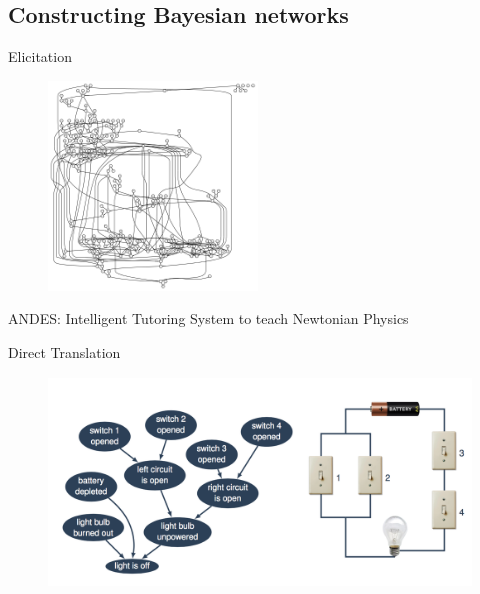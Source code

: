 \subsection{Constructing Bayesian networks}
	\begin{frame}
	\end{frame}
	
	\begin{frame}{Elicitation}
		\begin{figure}
			\centering
			\includegraphics[height=15em]{images/andes}
		\end{figure}
		ANDES: Intelligent Tutoring System to teach Newtonian Physics
	\end{frame}
	
	\begin{frame}{Direct Translation}
		\begin{figure}
			\centering
			\includegraphics[height=15em]{images/translation}
		\end{figure}
	\end{frame}